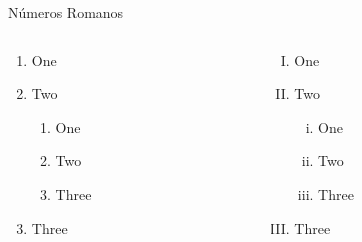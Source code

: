 \begin{slide}{Números Romanos}
  \begin{columns}[T]
    \begin{column}{0.48\textwidth}
      \begin{enumerate}[I]
        \item One
        \item Two
              \begin{enumerate}[i]
                \item One
                \item Two
                \item Three
              \end{enumerate}
        \item Three
      \end{enumerate}
    \end{column}%
    \hfill%
    \begin{column}{0.48\textwidth}
      \begin{enumerate}[(I)]
        \item One
        \item Two
              \begin{enumerate}[(i)]
                \item One
                \item Two
                \item Three
              \end{enumerate}
        \item Three
      \end{enumerate}
    \end{column}%
  \end{columns}
\end{slide}

